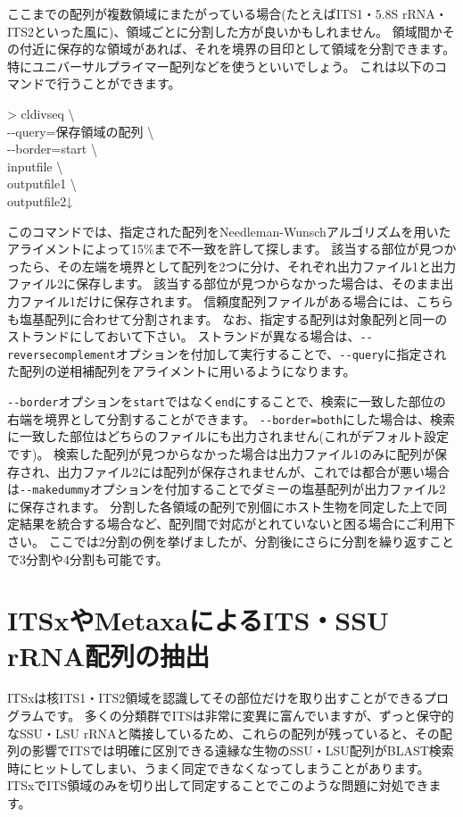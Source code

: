 \documentclass[titlepage,10pt,a4paper,english]{jsbook}
\newenvironment{cmd}{\begin{oframed}\raggedright\ttfamily\footnotesize\setlength{\baselineskip}{1.4em}}{\end{oframed}\vspace{-1em}}
\begin{document}
ここまでの配列が複数領域にまたがっている場合(たとえばITS1・5.8S rRNA・ITS2といった風に)、領域ごとに分割した方が良いかもしれません。
領域間かその付近に保存的な領域があれば、それを境界の目印として領域を分割できます。
特にユニバーサルプライマー配列などを使うといいでしょう。
これは以下のコマンドで行うことができます。
\begin{cmd}
{\textgreater} cldivseq {\textbackslash}\\
{-}{-}query=保存領域の配列 {\textbackslash}\\
{-}{-}border=start {\textbackslash}\\
inputfile {\textbackslash}\\
outputfile1 {\textbackslash}\\
outputfile2↓
\end{cmd}
このコマンドでは、指定された配列をNeedleman-Wunschアルゴリズムを用いたアライメントによって15\%まで不一致を許して探します。
該当する部位が見つかったら、その左端を境界として配列を2つに分け、それぞれ出力ファイル1と出力ファイル2に保存します。
該当する部位が見つからなかった場合は、そのまま出力ファイル1だけに保存されます。
信頼度配列ファイルがある場合には、こちらも塩基配列に合わせて分割されます。
なお、指定する配列は対象配列と同一のストランドにしておいて下さい。
ストランドが異なる場合は、\texttt{{-}{-}reversecomplement}オプションを付加して実行することで、\texttt{{-}{-}query}に指定された配列の逆相補配列をアライメントに用いるようになります。

\texttt{{-}{-}border}オプションを\texttt{start}ではなく\texttt{end}にすることで、検索に一致した部位の右端を境界として分割することができます。
\texttt{{-}{-}border=both}にした場合は、検索に一致した部位はどちらのファイルにも出力されません(これがデフォルト設定です)。
検索した配列が見つからなかった場合は出力ファイル1のみに配列が保存され、出力ファイル2には配列が保存されませんが、これでは都合が悪い場合は\texttt{{-}{-}makedummy}オプションを付加することでダミーの塩基配列が出力ファイル2に保存されます。
分割した各領域の配列で別個にホスト生物を同定した上で同定結果を統合する場合など、配列間で対応がとれていないと困る場合にご利用下さい。
ここでは2分割の例を挙げましたが、分割後にさらに分割を繰り返すことで3分割や4分割も可能です。

\section{ITSxやMetaxaによるITS・SSU rRNA配列の抽出}

ITSxは核ITS1・ITS2領域を認識してその部位だけを取り出すことができるプログラムです\citep{Bengtsson2013}。
多くの分類群でITSは非常に変異に富んでいますが、ずっと保守的なSSU・LSU rRNAと隣接しているため、これらの配列が残っていると、その配列の影響でITSでは明確に区別できる遠縁な生物のSSU・LSU配列がBLAST検索時にヒットしてしまい、うまく同定できなくなってしまうことがあります。
ITSxでITS領域のみを切り出して同定することでこのような問題に対処できます。
\end{document}
